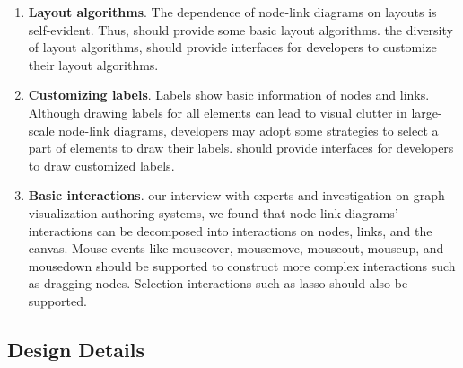 \begin{enumerate}[label*=\textbf{R\arabic*}]
\item 
    \textbf{Layout algorithms}.
    The dependence of node-link diagrams on layouts is self-evident.
    Thus, \name should provide some basic layout algorithms.
     the diversity of layout algorithms, \name should provide interfaces for developers to customize their layout algorithms.
\label{R:layout}

\item 
    \textbf{Customizing labels}.
    Labels show basic information of nodes and links.
    Although drawing labels for all elements can lead to visual clutter in large-scale node-link diagrams, developers may adopt some strategies to select a part of elements to draw their labels.
    \name should provide interfaces for developers to draw customized labels.
\label{R:label}

\item
    \textbf {Basic interactions}.
     our interview with experts and investigation on graph visualization authoring systems, we found that node-link diagrams' interactions can be decomposed into interactions on nodes, links, and the canvas.
    Mouse events like mouseover, mousemove, mouseout, mouseup, and mousedown should be supported to construct more complex interactions such as dragging nodes.
Selection interactions such as lasso should also be supported.
\label{R:interactions}
\end{enumerate}

\subsection{Design Details}
\newcommand{\RenEng}{\textit{Rendering Engine}\xspace}
\newcommand{\GraModMan}{\textit{Graph Model Manager}\xspace}
\newcommand{\IntMan}{\textit{Interaction Manager}\xspace}

